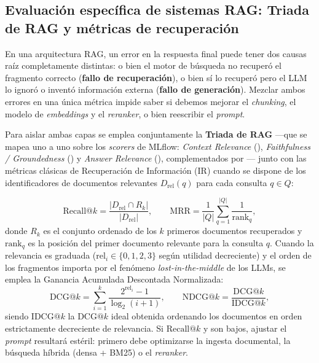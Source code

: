 \subsection{Evaluación específica de sistemas RAG: Triada de RAG y métricas de recuperación}\label{subsec:evaluacion-rag}

En una arquitectura RAG, un error en la respuesta final puede tener dos causas raíz completamente distintas: o bien el motor de búsqueda no recuperó el fragmento correcto (\textbf{fallo de recuperación}), o bien sí lo recuperó pero el LLM lo ignoró o inventó información externa (\textbf{fallo de generación}). Mezclar ambos errores en una única métrica impide saber si debemos mejorar el \textit{chunking}, el modelo de \textit{embeddings} y el \textit{reranker}, o bien reescribir el \textit{prompt}.

Para aislar ambas capas se emplea conjuntamente la \textbf{Triada de RAG} ---que se mapea uno a uno sobre los \textit{scorers} de MLflow: \textit{Context Relevance} (), \textit{Faithfulness / Groundedness} () y \textit{Answer Relevance} (), complementados por --- junto con las métricas clásicas de Recuperación de Información (IR) cuando se dispone de los identificadores de documentos relevantes $D_{\text{rel}}(q)$ para cada consulta $q \in Q$:

\begin{equation}\label{eq:ir-recall-mrr}
  \text{Recall}@k = \frac{|D_{\text{rel}} \cap R_k|}{|D_{\text{rel}}|},
  \qquad
  \text{MRR} = \frac{1}{|Q|} \sum_{q=1}^{|Q|} \frac{1}{\text{rank}_q},
\end{equation}
donde $R_k$ es el conjunto ordenado de los $k$ primeros documentos recuperados y $\text{rank}_q$ es la posición del primer documento relevante para la consulta $q$. Cuando la relevancia es graduada ($\text{rel}_i \in \{0, 1, 2, 3\}$ según utilidad decreciente) y el orden de los fragmentos importa por el fenómeno \textit{lost-in-the-middle} de los LLMs, se emplea la Ganancia Acumulada Descontada Normalizada:
\begin{equation}\label{eq:ir-ndcg}
  \text{DCG}@k = \sum_{i=1}^{k} \frac{2^{\text{rel}_i} - 1}{\log_2(i + 1)},
  \qquad
  \text{NDCG}@k = \frac{\text{DCG}@k}{\text{IDCG}@k},
\end{equation}
siendo $\text{IDCG}@k$ la $\text{DCG}@k$ ideal obtenida ordenando los documentos en orden estrictamente decreciente de relevancia. Si $\text{Recall}@k$ y  son bajos, ajustar el \textit{prompt} resultará estéril: primero debe optimizarse la ingesta documental, la búsqueda híbrida (densa + BM25) o el \textit{reranker}.

